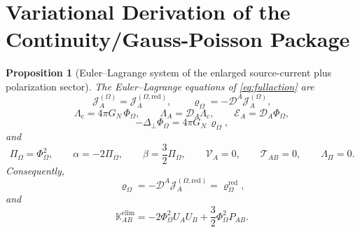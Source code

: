 \documentclass[11pt]{article}
\newcommand{\ProjSub}{P}
\newcommand{\SpatialD}{\mathcal D}
\newcommand{\LapPerp}{\Delta_\perp}
\newcommand{\FlowPot}{\Phi_\Omega}
\newcommand{\BalanceField}{\Pi_\Omega}
\newcommand{\BalMult}{\Lambda_\Pi}
\newcommand{\SourceDensity}{\varrho_\Omega}
\newcommand{\SourceDensityRed}{\varrho_\Omega^{\mathrm{red}}}
\newcommand{\SourceCurrent}{\mathcal J^{(\Omega)}}
\newcommand{\SourceCurrentRed}{\mathcal J^{(\Omega,\mathrm{red})}}
\newcommand{\ContMult}{\Lambda_{\mathrm c}}
\newcommand{\CurrentMult}{\Lambda}
\newcommand{\SourceFlux}{\mathcal E}
\newcommand{\AuxPol}{\mathbb K}
\newtheorem{proposition}{Proposition}
\begin{document}
\section{Variational Derivation of the Continuity/Gauss-Poisson Package}

\begin{proposition}[Euler--Lagrange system of the enlarged source-current plus polarization sector]
\label{prop:EL}
The Euler--Lagrange equations of \eqref{eq:fullaction} are
\begin{equation}
\SourceCurrent_A=\SourceCurrentRed_A,
\qquad
\SourceDensity=-\SpatialD^A\SourceCurrent_A,
\label{eq:currenteqs}
\end{equation}
\begin{equation}
\ContMult=4\pi G_N\,\FlowPot,
\qquad
\CurrentMult_A=\SpatialD_A\ContMult,
\qquad
\SourceFlux_A=\SpatialD_A\FlowPot,
\label{eq:multflux}
\end{equation}
\begin{equation}
-\LapPerp \FlowPot=4\pi G_N\,\SourceDensity,
\label{eq:poisson}
\end{equation}
and
\begin{equation}
\BalanceField=\FlowPot^2,
\qquad
\alpha=-2\BalanceField,
\qquad
\beta=\frac32\BalanceField,
\qquad
\mathcal V_A=0,
\qquad
\mathcal T_{AB}=0,
\qquad
\BalMult=0.
\label{eq:poleqs}
\end{equation}
Consequently,
\begin{equation}
\SourceDensity
=
-\SpatialD^A\SourceCurrentRed_A
=
\SourceDensityRed,
\label{eq:rhorecovered}
\end{equation}
and
\begin{equation}
\AuxPol_{AB}^{\mathrm{elim}}
=
-2\FlowPot^2U_AU_B
+\frac32\FlowPot^2\ProjSub_{AB}.
\label{eq:Kelim}
\end{equation}
\end{proposition}
\end{document}
